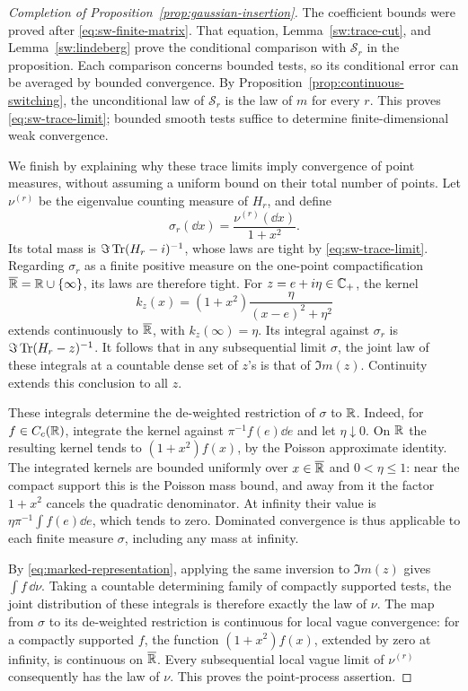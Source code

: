 \begin{proof}[Completion of Proposition~\ref{prop:gaussian-insertion}]
The coefficient bounds were proved after \eqref{eq:sw-finite-matrix}.
That equation, Lemma~\ref{sw:trace-cut}, and Lemma~\ref{sw:lindeberg} prove
the conditional comparison with \(\mathcal S_r\) in the proposition.
Each comparison concerns bounded tests, so its conditional error can be
averaged by bounded convergence. By
Proposition~\ref{prop:continuous-switching}, the unconditional law of
\(\mathcal S_r\) is the law of \(m\) for every \(r\). This proves
\eqref{eq:sw-trace-limit}; bounded smooth tests suffice to determine
finite-dimensional weak convergence.

We finish by explaining why these trace limits imply convergence of point
measures, without assuming a uniform bound on their total number of
points. Let \(\nu^{(r)}\) be the eigenvalue counting measure of \(H_r\), and
define
\[
 \sigma_r(\dd x)=\frac{\nu^{(r)}(\dd x)}{1+x^2}.
\]
Its total mass is \(\Im\operatorname{Tr}(H_r-i)^{-1}\), whose laws are tight by
\eqref{eq:sw-trace-limit}. Regarding \(\sigma_r\) as a finite positive
measure on the one-point compactification
\(\overline{\mathbb R}=\mathbb R\cup\{\infty\}\), its laws are therefore tight.
For \(z=e+i\eta\in\mathbb C_+\), the kernel
\[
 k_z(x)=(1+x^2)\frac{\eta}{(x-e)^2+\eta^2}
\]
extends continuously to \(\overline{\mathbb R}\), with \(k_z(\infty)=\eta\).
Its integral against \(\sigma_r\) is \(\Im\operatorname{Tr}(H_r-z)^{-1}\).
It follows that in any subsequential limit \(\sigma\), the joint law of
these integrals at a countable dense set of \(z\)'s is that of
\(\Im m(z)\). Continuity extends this conclusion to all \(z\).

These integrals determine the de-weighted restriction of \(\sigma\) to
\(\mathbb R\). Indeed, for \(f\in C_c(\mathbb R)\), integrate the kernel against
\(\pi^{-1}f(e)\dd e\) and let \(\eta\downarrow0\). On \(\mathbb R\) the resulting
kernel tends to \((1+x^2)f(x)\), by the Poisson approximate identity.
The integrated kernels are bounded uniformly over
\(x\in\overline{\mathbb R}\) and \(0<\eta\le1\): near the compact support this is
the Poisson mass bound, and away from it the factor \(1+x^2\) cancels
the quadratic denominator. At infinity their value is
\(\eta\pi^{-1}\int f(e)\dd e\), which tends to zero.
Dominated convergence is thus applicable to each finite measure
\(\sigma\), including any mass at infinity.

By \eqref{eq:marked-representation}, applying the same inversion to
\(\Im m(z)\) gives \(\int f\,\dd\nu\). Taking a countable determining
family of compactly supported tests, the joint distribution of these
integrals is therefore exactly the law of \(\nu\).
The map from \(\sigma\) to its de-weighted restriction is continuous for
local vague convergence: for a compactly supported \(f\), the function
\((1+x^2)f(x)\), extended by zero at infinity, is continuous on
\(\overline{\mathbb R}\). Every subsequential local vague limit of
\(\nu^{(r)}\) consequently has the law of \(\nu\).
This proves the point-process assertion.
\end{proof}
